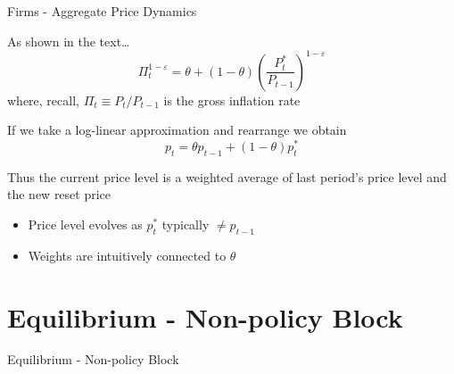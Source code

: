 \documentclass{beamer}
\begin{document}

	
\begin{frame}{Firms - Aggregate Price Dynamics}

As shown in the text\ldots
\begin{equation*}
\Pi_{t}^{1-\varepsilon} = \theta + (1-\theta)\left( \frac{P_{t}^{\ast}}{P_{t-1}} \right)^{1-\varepsilon} \label{eqn:gross_infl}
\end{equation*}
where, recall,  $\Pi_{t}\equiv P_{t}/P_{t-1}$ is the gross inflation rate

\vspace{3mm}
If we take a log-linear approximation and rearrange we obtain
\[
p_{t} = \theta p_{t-1} + (1-\theta) p_{t}^{\ast}
\]

\vspace{3mm}
Thus the current price level is a weighted average of last period's price level and the new reset price
\begin{itemize}
\item	Price level evolves as $p_{t}^{\ast}$ typically $\neq p_{t-1}$
\item	Weights are intuitively connected to $\theta$
\end{itemize}

\end{frame}

\section{Equilibrium - Non-policy Block}

\begin{frame}

\begin{center}
{\LARGE Equilibrium - Non-policy Block}
\end{center}

\end{frame}


	
\end{document}
